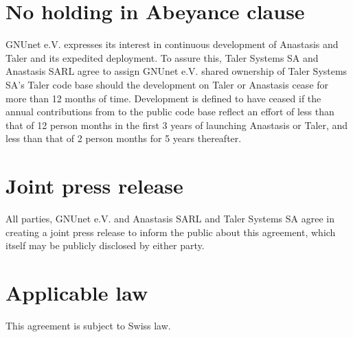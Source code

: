 \documentclass[12pt, a4paper, bibliography=totocnumbered]{article}
\begin{document}
\section*{No holding in Abeyance clause}

GNUnet e.V. expresses its interest in continuous development of
Anastasis and Taler and its expedited deployment. To assure this,
Taler Systems SA and Anastasis SARL agree to assign GNUnet e.V. shared
ownership of Taler Systems SA's Taler code base should the development
on Taler or Anastasis cease for more than 12 months of
time. Development is defined to have ceased if the annual
contributions from to the public code base reflect an effort of less
than that of 12 person months in the first 3 years of launching
Anastasis or Taler, and less than that of 2 person months for 5 years
thereafter.

\section*{Joint press release}

All parties, GNUnet e.V. and Anastasis SARL and Taler Systems SA agree
in creating a joint press release to inform the public about this
agreement, which itself may be publicly disclosed by either party.

\section*{Applicable law}
This agreement is subject to Swiss law.
\end{document}
